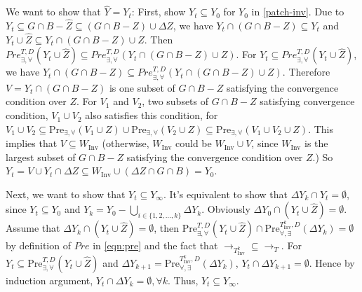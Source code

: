 	We want to show that $ \widehat{Y} = Y_t$: First, show $ Y_t \subseteq Y_0 $ for $ Y_0 $ in \eqref{patch-inv}. Due to $ Y_t \subseteq G\cap B-\widehat{Z} \subseteq (G\cap B -Z)\cup \Delta Z $, we have $ Y_t\cap (G\cap B-Z)\subseteq Y_t $ and $ Y_t\cup \widehat{Z} \subseteq Y_t\cap (G\cap B-Z)\cup Z$. Then $ Pre^{T,D}_{\exists,\forall}(Y_t\cup \widehat{Z}) \subseteq Pre^{T,D}_{\exists,\forall}(Y_t\cap (G\cap B-Z)\cup Z)$. For $ Y_t \subseteq Pre^{T,D}_{\exists,\forall}(Y_t\cup \widehat{Z})$, we have $ Y_t\cap (G\cap B-Z)\subseteq Pre^{T,D}_{\exists,\forall}(Y_t\cap (G\cap B-Z)\cup Z) $. Therefore $ V= Y_t \cap (G\cap B -Z) $ is one subset of $ G\cap B -Z $ satisfying the convergence condition over $ Z $. For $ V_1 $ and $ V_2 $, two subsets of $ G\cap B-Z $ satisfying convergence condition, $ V_1\cup V_2 $ also satisfies this condition, for $ V_1\cup V_2\subseteq \text{Pre}_{\exists,\forall}(V_1\cup Z)\cup \text{Pre}_{\exists,\forall}(V_2\cup Z)\subseteq \text{Pre}_{\exists,\forall}(V_1\cup V_2\cup Z) $. This implies that $ V \subseteq W_{\text{Inv}} $ (otherwise, $ W_{\text{Inv}} $ could be $ W_{\text{Inv}}\cup V $, since $ W_{\text{Inv}} $ is the largest subset of $ G\cap B-Z $ satisfying the convergence condition over $ Z $.) So $ Y_t = V\cup Y_t\cap \Delta Z \subseteq W_{\text{Inv}}\cup (\Delta Z \cap G\cap B) = Y_0$. 
	
	Next, we want to show that $ Y_t \subseteq Y_{\infty} $. It's equivalent to show that $ \Delta Y_k\cap Y_t = \emptyset $, since $ Y_t\subseteq Y_0 $ and $ Y_k = Y_0 - \bigcup_{i\in \{1,2,...,k\}} \Delta Y_k$. Obviously $ \Delta Y_0\cap (Y_t\cup \widehat{Z}) = \emptyset $. Assume that $ \Delta Y_k \cap (Y_t\cup \widehat{Z}) = \emptyset $, then $ \text{Pre}_{\exists,\forall}^{T,D} (Y_t\cup \widehat{Z}) \cap \text{Pre}_{\forall, \exists}^{T_{\text{Inv}}^k,D}(\Delta Y_k) = \emptyset$ by definition of $ Pre $ in \eqref{eqn:pre} and the fact that $ \rightarrow_{T_{\text{Inv}}^k}\subseteq \rightarrow_{T} $. For $ Y_t \subseteq \text{Pre}_{\exists,\forall}^{T,D} (Y_t\cup \widehat{Z}) $ and $ \Delta Y_{k+1} = \text{Pre}_{\forall, \exists}^{T_{\text{Inv}}^k,D}(\Delta Y_k) $, $ Y_t\cap \Delta Y_{k+1} = \emptyset $. Hence by induction argument, $ Y_t \cap \Delta Y_k = \emptyset, \forall k $. Thus, $ Y_t\subseteq Y_{\infty} $. 
	
